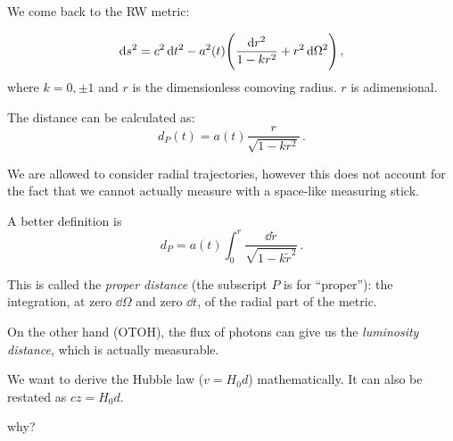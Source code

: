 \documentclass[main.tex]{subfiles}
\begin{document}





We come back to the RW metric:

\begin{equation}
  \dd{s^2} = c^{2} \dd{t^{2}} - a^2(t) \qty(\frac{\dd{r^2}}{1-kr^2} + r^2 \dd{\Omega^2})\,,
\end{equation}
%
where \(k=0, \pm 1\) and \(r\) is the dimensionless comoving radius.
\(r\) is adimensional.

The distance can be calculated as:
%
\begin{equation}
  d_P (t) = a(t)\frac{r}{\sqrt{1-kr^2}}\,.
\end{equation}

We are allowed to consider radial trajectories, however this does not account for the fact that we cannot actually measure with a space-like measuring stick.

A better definition is
%
\begin{equation}
  d_P = a(t) \int_0^r \frac{\dd{\widetilde{r}}}{\sqrt{1-k \widetilde{r}^2}}\,.
\end{equation}

This is called the \emph{proper distance} (the subscript \(P\) is for ``proper''): the integration, at zero \(\dd{\Omega}\) and zero \(\dd{t}\), of the radial part of the metric.

On the other hand (OTOH), the flux of photons can give us the \emph{luminosity distance}, which is actually measurable.

We want to derive the Hubble law (\(v = H_0 d\)) mathematically. It can also be restated as \(cz = H_0 d\). 

\begin{greenbox}
  why?
\end{greenbox}
\end{document}
